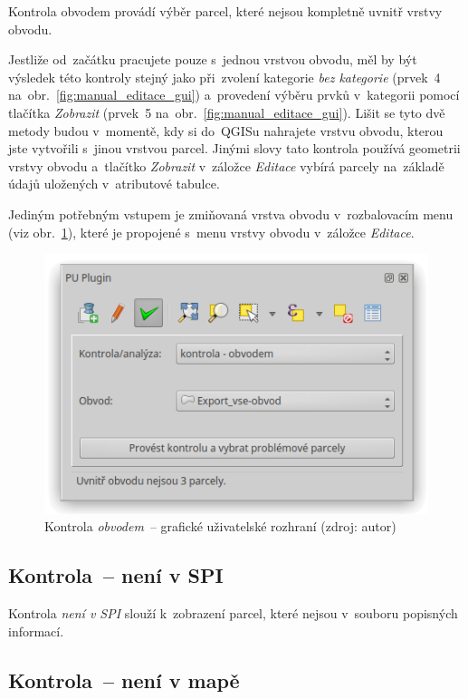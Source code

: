 Kontrola obvodem provádí výběr parcel, které nejsou kompletně uvnitř
vrstvy obvodu.

Jestliže od~začátku pracujete pouze s~jednou vrstvou obvodu, měl by
být výsledek této kontroly stejný jako při~zvolení kategorie
\textit{bez kategorie} (prvek~4 na~obr.~\ref{fig:manual_editace_gui})
a~provedení výběru prvků v~kategorii pomocí tlačítka \textit{Zobrazit}
(prvek~5 na~obr.~\ref{fig:manual_editace_gui}). Lišit se tyto dvě
metody budou v~momentě, kdy si do~QGISu nahrajete vrstvu obvodu,
kterou jste vytvořili s~jinou vrstvou parcel. Jinými slovy tato
kontrola používá geometrii vrstvy obvodu a~tlačítko \textit{Zobrazit}
v~záložce \textit{Editace} vybírá parcely na~základě údajů uložených
v~atributové tabulce.

Jediným potřebným vstupem je zmiňovaná vrstva obvodu v~rozbalovacím
menu (viz obr.~\ref{fig:manual_kontrola_obvodem_gui}), které je
propojené s~menu vrstvy obvodu v~záložce \textit{Editace}.

	\begin{figure}[H] \centering
		\includegraphics[width=.55\textwidth]{./pictures/kontrola-obvodem.png}
		\caption[Kontrola \textit{obvodem}~– grafické
uživatelské rozhraní]{Kontrola \textit{obvodem}~– grafické uživatelské
rozhraní (zdroj: autor)}
		\label{fig:manual_kontrola_obvodem_gui}
 	\end{figure}

\subsection{Kontrola~– není v SPI}
\label{manual_kontrola_neni_v_spi}

Kontrola \textit{není v SPI} slouží k~zobrazení parcel, které nejsou
v~souboru popisných informací.

\subsection{Kontrola~– není v mapě}
\label{manual_kontrola_neni_v_mape}

